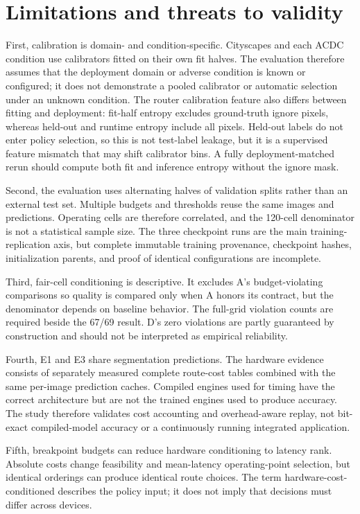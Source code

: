 \documentclass[a4paper,review,12pt]{elsarticle}
\begin{document}
\section{Limitations and threats to validity}
\label{sec:limitations}

First, calibration is domain- and condition-specific. Cityscapes and each ACDC condition use calibrators fitted on their own fit halves. The evaluation therefore assumes that the deployment domain or adverse condition is known or configured; it does not demonstrate a pooled calibrator or automatic selection under an unknown condition. The router calibration feature also differs between fitting and deployment: fit-half entropy excludes ground-truth ignore pixels, whereas held-out and runtime entropy include all pixels. Held-out labels do not enter policy selection, so this is not test-label leakage, but it is a supervised feature mismatch that may shift calibrator bins. A fully deployment-matched rerun should compute both fit and inference entropy without the ignore mask.

Second, the evaluation uses alternating halves of validation splits rather than an external test set. Multiple budgets and thresholds reuse the same images and predictions. Operating cells are therefore correlated, and the 120-cell denominator is not a statistical sample size. The three checkpoint runs are the main training-replication axis, but complete immutable training provenance, checkpoint hashes, initialization parents, and proof of identical configurations are incomplete.

Third, fair-cell conditioning is descriptive. It excludes A's budget-violating comparisons so quality is compared only when A honors its contract, but the denominator depends on baseline behavior. The full-grid violation counts are required beside the 67/69 result. D's zero violations are partly guaranteed by construction and should not be interpreted as empirical reliability.

Fourth, E1 and E3 share segmentation predictions. The hardware evidence consists of separately measured complete route-cost tables combined with the same per-image prediction caches. Compiled engines used for timing have the correct architecture but are not the trained engines used to produce accuracy. The study therefore validates cost accounting and overhead-aware replay, not bit-exact compiled-model accuracy or a continuously running integrated application.

Fifth, breakpoint budgets can reduce hardware conditioning to latency rank. Absolute costs change feasibility and mean-latency operating-point selection, but identical orderings can produce identical route choices. The term hardware-cost-conditioned describes the policy input; it does not imply that decisions must differ across devices.
\end{document}
